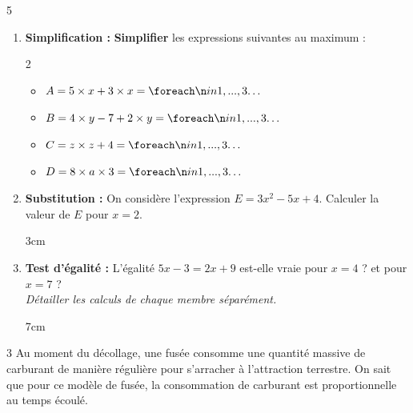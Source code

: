 \documentclass[a4paper]{book}
\begin{document}
{    \begin{exerciceNote}{5} %
        \begin{enumerate}
            \item \textbf{Simplification :} \textbf{Simplifier} les expressions suivantes au maximum :
            
            \begin{multicols}{2}
                \begin{itemize}[label=\textbullet]
                    \item $A = 5 \times x + 3 \times x = \points[3]$
                    \item $B = 4 \times y - 7 + 2 \times y = \points[3]$
                    \item $C = z \times z + 4 = \points[3]$
                    \item $D = 8 \times a \times 3 = \points[3]$
                \end{itemize}
            \end{multicols}
        
            \item \textbf{Substitution :} On considère l'expression $E = 3x^2 - 5x + 4$. 
            Calculer la valeur de $E$ pour $x = 2$.
            
            \begin{ZoneReponse}{3cm}
            \end{ZoneReponse}


\newpage

        
            \item \textbf{Test d'égalité :} 
            L'égalité $5x - 3 = 2x + 9$ est-elle vraie pour $x = 4$ ? et pour $x= 7$ ?\\
            \textit{Détailler les calculs de chaque membre séparément.}
        
            \begin{ZoneReponse}{7cm}
            \end{ZoneReponse}
        \end{enumerate}
    \end{exerciceNote}


    \begin{exerciceNote}{3}
        Au moment du décollage, une fusée consomme une quantité massive de carburant de manière régulière pour s'arracher à l'attraction terrestre. 
        On sait que pour ce modèle de fusée, la consommation de carburant est proportionnelle au temps écoulé.
        

\end{exerciceNote}}
\end{document}
